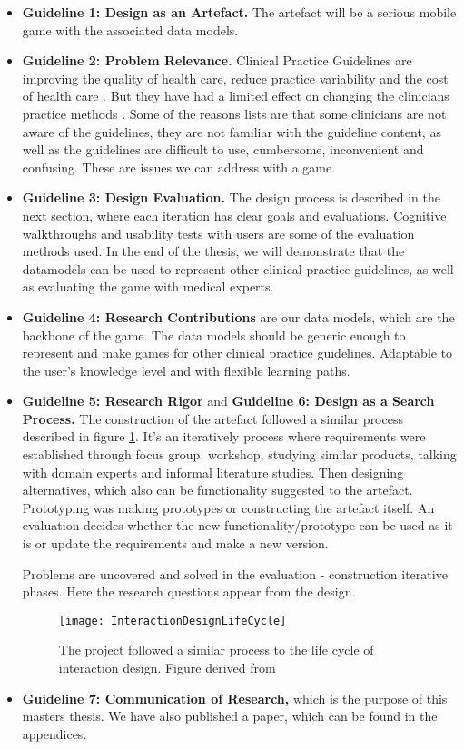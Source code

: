 \begin{itemize}
	\item \textbf{Guideline 1: Design as an Artefact.} The artefact will be a serious mobile game with the associated data models.
	\item \textbf{Guideline 2: Problem Relevance.} Clinical Practice Guidelines are improving the quality of health care, reduce practice variability and the cost of health care \parencite{DeClercq2008}. But they have had a limited effect on changing the clinicians practice methods \parencite{Cabana1999}. Some of the reasons \textcite{Cabana1999} lists are that some clinicians are not aware of the guidelines, they are not familiar with the guideline content, as well as the guidelines are difficult to use, cumbersome, inconvenient and confusing. These are issues we can address with a game.
	\item \textbf{Guideline 3: Design Evaluation.} The design process is described in the next section, where each iteration has clear goals and evaluations. Cognitive walkthroughs and usability tests with users are some of the evaluation methods used. In the end of the thesis, we will demonstrate that the datamodels can be used to represent other clinical practice guidelines, as well as evaluating the game with medical experts.
	\item \textbf{Guideline 4: Research Contributions} are our data models, which are the backbone of the game. The data models should be generic enough to represent and make games for other clinical practice guidelines. Adaptable to the user's knowledge level and with flexible learning paths.
	\item \textbf{Guideline 5: Research Rigor} and \textbf{Guideline 6: Design as a Search Process.} The construction of the artefact followed a similar process described in figure \ref{fig:InteractionDesignLifeCycle}. It's an iteratively process where requirements were established through focus group, workshop, studying similar products, talking with domain experts and informal literature studies. Then designing alternatives, which also can be functionality suggested to the artefact. Prototyping was making prototypes or constructing the artefact itself. An evaluation decides whether the new functionality/prototype can be used as it is or update the requirements and make a new version.
	
	Problems are uncovered and solved in the evaluation - construction iterative phases. Here the research questions appear from the design. 
	
		\begin{figure}[h!]
		\texttt{[image: InteractionDesignLifeCycle]}
		\caption {The project followed a similar process to the life cycle of interaction design. Figure derived from \textcite{Preece2015}}
		\label{fig:InteractionDesignLifeCycle}
	\end{figure}
	\item \textbf{Guideline 7: Communication of Research,} which is the purpose of this masters thesis. We have also published a paper, which can be found in the appendices.
\end{itemize}


